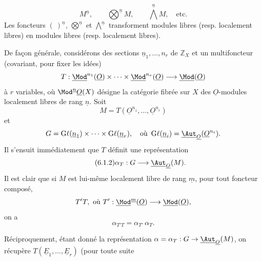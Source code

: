 
\begin{equation}\tag{6.1.1}
 M^{\underline{n}},\qquad \bigotimes^{\underline{n}} M,\qquad \bigwedge^{\underline{n}} M,\quad\text{etc.}
\end{equation}
Les
foncteurs \((\ )^{\underline{n}}\), \(\bigotimes\limits^{\underline{n}}\) et \(\bigwedge\limits^{\underline{n}}\) transforment modules libres (resp. localement libres) en modules libres (resp. localement libres).

De façon générale, considérons des sections \(\underline{n}_1,\ldots,n_r\) de \(\mathbb Z_X\) et un multifoncteur (covariant, pour fixer les idées)
\[
 T:\underline{\Mod}^{n_1}(\underline{O})\times\cdots\times
 \underline{\Mod}^{n_r}(\underline{O})\longrightarrow\underline{\Mod}(\underline{O})
\]
à \(r\) variables, où \(\Mod^{\underline{n}}\underline{O}(X)\) désigne la catégorie fibrée sur \(X\) des \(\underline{O}\)-modules localement libres de rang \(\underline{n}\). Soit
\[
 M=T(\underline{O}^{\underline{n}_1},\ldots,\underline{O}^{\underline{n}_r})
\]
et
\[
 G=\operatorname{G\ell}(\underline{n}_1)\times\cdots\times\operatorname{G\ell}(\underline{n}_r),
 \quad\text{où }\operatorname{G\ell}(\underline{n}_i)=\underline{\Aut}_{\underline{O}}(\underline{O}^{n_i}).
\]
Il s'ensuit immédiatement que \(T\) définit une représentation
\begin{equation}\tag{6.1.2}
 \alpha_T:G\longrightarrow\underline{\Aut}_{\underline{O}}(M).
\end{equation}
Il est clair que si \(M\) est lui-même localement libre de rang \(\underline{m}\), pour tout foncteur composé,
\[
 T'T,\ \text{où } T':\underline{\Mod}^{\underline{m}}(\underline{O})\longrightarrow\underline{\Mod}(\underline{O}),
\]
on a
\begin{equation}\tag{6.1.3}
 \alpha_{T'T}=\alpha_{T'}\,\alpha_T.
\end{equation}

Réciproquement, étant donné la représentation \(\alpha=\alpha_T:G\to\underline{\Aut}_{\underline{O}}(M)\), on récupère \(T(\underline{E}_1,\ldots,\underline{E}_r)\) (pour toute suite
